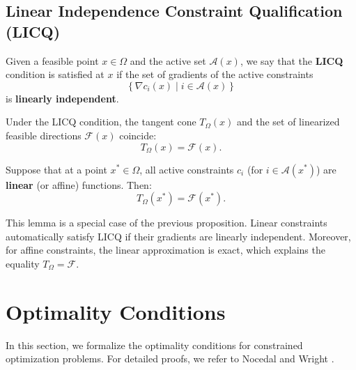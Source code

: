 \subsection{Linear Independence Constraint Qualification (LICQ)}

\begin{definition}
    Given a feasible point $x \in \Omega$ and the active set $\mathcal{A}(x)$, we say that the \textbf{LICQ} condition is satisfied at $x$ if the set of gradients of the active constraints
    \begin{equation}
        \left\{ \nabla c_i(x) \mid i \in \mathcal{A}(x) \right\}
    \end{equation}
    is \textbf{linearly independent}.
\end{definition}

\begin{proposition}
    Under the LICQ condition, the tangent cone $T_\Omega(x)$ and the set of linearized feasible directions $\mathcal{F}(x)$ coincide:
    \begin{equation}
        T_\Omega(x) = \mathcal{F}(x).
    \end{equation}
\end{proposition}

\begin{lemme}
    Suppose that at a point $x^* \in \Omega$, all active constraints $c_i$ (for $i \in \mathcal{A}(x^*)$) are \textbf{linear} (or affine) functions. Then:
    \begin{equation}
        T_\Omega(x^*) = \mathcal{F}(x^*).
    \end{equation}
\end{lemme}

\begin{remarque}
    This lemma is a special case of the previous proposition. Linear constraints automatically satisfy LICQ if their gradients are linearly independent. Moreover, for affine constraints, the linear approximation is exact, which explains the equality $T_\Omega = \mathcal{F}$.
\end{remarque}

\section{Optimality Conditions}

In this section, we formalize the optimality conditions for constrained optimization problems. For detailed proofs, we refer to Nocedal and Wright \cite{nocedal2006numerical}.

